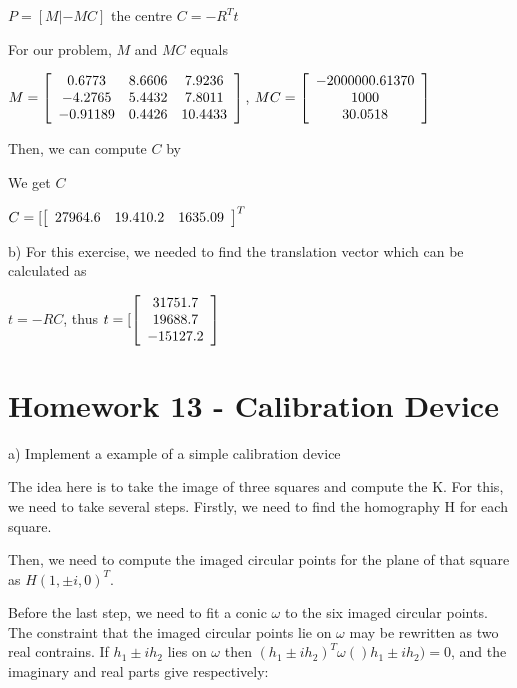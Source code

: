 \documentclass[]{article}
\begin{document}
\centerline {
	$P = [M| -MC]$ the centre $C = -R^Tt$
}

For our problem, $M$ and $MC$ equals 

\centerline {
	$M = \left[ {\begin{array}{*{20}c}
		0.6773 & 8.6606 & 7.9236 \\
		-4.2765 & 5.4432 & 7.8011 \\ 
		-0.91189 & 0.4426 & 10.4433     
		\end{array} } \right]$, $MC = \left[ {\begin{array}{*{20}c}
		-2000000.61370 \\
		1000 \\ 
		30.0518     
		\end{array} } \right] $
}

Then, we can compute $C$ by



We get  $C$ 

\centerline {
	$C = [\left[ {\begin{array}{*{20}c}
		27964.6 &  19.410.2 & 1635.09   
		\end{array} } \right]^T$
}

b) For this exercise, we needed to find the translation vector which can be calculated as 

\centerline {
	$t = -RC$, thus $t =[\left[ {\begin{array}{*{20}c}
		31751.7 \\
		19688.7 \\ 
		-15127.2   
		\end{array} } \right] $
}


\section{Homework 13 - Calibration Device }
a) Implement a example of a simple calibration device

The idea here is to take the image of three squares and compute the K. For this, we need to take several steps. Firstly, we need to find the homography H for each square. 

Then, we need to compute the imaged circular points for the plane of that square as $H(1, \pm i, 0)^T$. 


Before the last step, we need to fit a conic $\omega$ to the six imaged circular points. The constraint that the imaged circular points lie on $\omega$ may be rewritten as two real contrains. If $h_1 \pm ih_2$ lies on $\omega$ then $(h_1 \pm ih_2)^T \omega ()h_1 \pm ih_2) = 0$, and the imaginary and real parts give respectively: 
\end{document}
